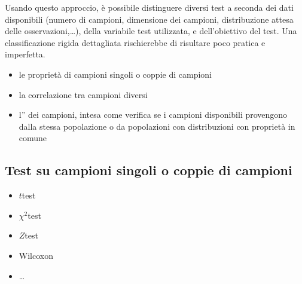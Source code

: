 \documentclass[letterpaper,10pt,italian]{jupyterBook}
\begin{document}
\sphinxAtStartPar
Usando questo approccio, è possibile distinguere diversi test a seconda dei dati disponibili (numero di campioni, dimensione dei campioni, distribuzione attesa delle osservazioni,…), della variabile test utilizzata, e dell’obiettivo del test. Una classificazione rigida dettagliata rischierebbe di risultare poco pratica e imperfetta.

\sphinxAtStartPar
{}
\begin{itemize}
\item {} 
\sphinxAtStartPar
le proprietà di campioni singoli o coppie di campioni

\item {} 
\sphinxAtStartPar
la correlazione tra campioni diversi

\item {} 
\sphinxAtStartPar
l” dei campioni, intesa come verifica se i campioni disponibili provengono dalla stessa popolazione o da popolazioni con distribuzioni con proprietà in comune

\end{itemize}





\sphinxstepscope




\subsection{Test su campioni singoli o coppie di campioni}
\label{\detokenize{ch/statistics/hp-test-single:test-su-campioni-singoli-o-coppie-di-campioni}}\label{\detokenize{ch/statistics/hp-test-single::doc}}
\sphinxAtStartPar
{}
\begin{itemize}
\item {} 
\sphinxAtStartPar
\(t\)\sphinxhyphen{}test

\item {} 
\sphinxAtStartPar
\(\chi^2\)\sphinxhyphen{}test

\item {} 
\sphinxAtStartPar
\(Z\)\sphinxhyphen{}test

\item {} 
\sphinxAtStartPar
Wilcoxon

\item {} 
\sphinxAtStartPar
…

\end{itemize}
\end{document}
